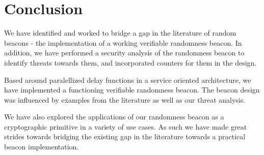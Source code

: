 \section{Conclusion}%
\label{sec:conclusion}
We have identified and worked to bridge a gap in the literature of random beacons - the implementation of a working verifiable randomness beacon. In addition, we have performed a security analysis of the randomness beacon to identify threats towards them, and incorporated counters for them in the design.

Based around paralellized delay functions in a service oriented architecture, we have implemented a functioning verifiable randomness beacon. The beacon design was influenced by examples from the literature as well as our threat analysis.

We have also explored the applications of our randomness beacon as a cryptographic primitive in a variety of use cases. As such we have made great strides towards bridging the existing gap in the literature towards a practical beacon implementation.